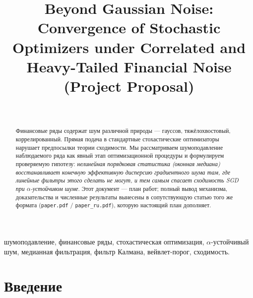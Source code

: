 \documentclass[conference]{IEEEtran}
\begin{document}
\title{Beyond Gaussian Noise: Convergence of Stochastic
Optimizers under Correlated and Heavy-Tailed Financial Noise\\
\large (Project Proposal)}

\author{%
\\
\and
{}
\and
{}
\and
{}
}

\maketitle

\begin{abstract}
Финансовые ряды содержат шум различной природы --- гауссов,
тяжёлохвостовый, коррелированный. Прямая подача в стандартные
стохастические оптимизаторы нарушает предпосылки теории сходимости. Мы
рассматриваем шумоподавление наблюдаемого ряда как явный этап
оптимизационной процедуры и формулируем проверяемую гипотезу:
\emph{нелинейная порядковая статистика (оконная медиана) восстанавливает
конечную эффективную дисперсию градиентного шума там, где линейные
фильтры этого сделать не могут, и тем самым спасает сходимость SGD при
$\alpha$-устойчивом шуме}. Этот документ --- план работ; полный вывод
механизма, доказательства и численные результаты вынесены в
сопутствующую статью того же формата (\texttt{paper.pdf} /
\texttt{paper\_ru.pdf}), которую настоящий план дополняет.
\end{abstract}

\begin{IEEEkeywords}
шумоподавление, финансовые ряды, стохастическая оптимизация,
$\alpha$-устойчивый шум, медианная фильтрация, фильтр Калмана,
вейвлет-порог, сходимость.
\end{IEEEkeywords}

\section{Введение}
\end{document}
